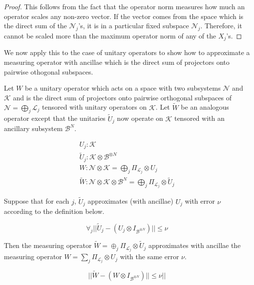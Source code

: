 \begin{proof}
This follows from the fact that the operator norm measures how much
an operator scales any non-zero vector. If the vector comes from the
space which is the direct sum of the $\mathcal{N}_j$'s, it is in a
particular fixed subspace $\mathcal{N}_j$. Therefore, it cannot be scaled
more than the maximum operator norm of any of the $X_j$'s.
\end{proof}

We now apply this to the case of unitary operators
to show how to approximate a measuring operator with
ancillae which is the direct sum of projectors onto pairwise othogonal subspaces.

\begin{lemma}
\label{lemma:error-sum}
Let $W$ be a unitary operator which acts on a space with two subsystems
$\mathcal{N}$ and $\mathcal{K}$ and is the direct sum of projectors onto
pairwise orthogonal subspaces of $\mathcal{N} = \bigoplus_j \mathcal{L}_j$
tensored with unitary operators on $\mathcal{K}$.
Let $\tilde{W}$ be an analogous operator except that the unitaries $\tilde{U}_j$
now operate on $\mathcal{K}$ tensored with an ancillary subsystem
$\mathcal{B}^N$.

\begin{eqnarray}
U_j : \mathcal{K}\\
\tilde{U}_j : \mathcal{K} \otimes \mathcal{B}^{\otimes N}\\
W : \mathcal{N} \otimes \mathcal{K} = \bigoplus_j \Pi_{\mathcal{L}_j} \otimes U_j \\
\tilde{W} : \mathcal{N} \otimes \mathcal{K} \otimes \mathcal{B}^N =
\bigoplus_j \Pi_{\mathcal{L}_j} \otimes \tilde{U}_j
\end{eqnarray}

Suppose that for each $j$,
$\tilde{U}_j$ approximates (with ancillae) $U_j$ with error $\nu$
according to the
definition below.

\begin{equation}
\forall_j || \tilde{U}_j - (U_j \otimes I_{\mathcal{B}^{\otimes N}}) || \le \nu
\label{eqn:uj_approx}
\end{equation}

Then the measuring operator
$\tilde{W} = \oplus_j \Pi_{\mathcal{L}_j} \otimes \tilde{U}_j$ approximates
with ancillae the measuring operator
$W = \sum_j \Pi_{\mathcal{L}_j} \otimes U_j$ with the same error $\nu$.

\begin{equation}
|| \tilde{W} - (W \otimes I_{\mathcal{B}^{\otimes N}}) || \le \nu ||
\end{equation}

\end{lemma}


